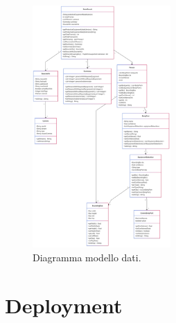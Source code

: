 \begin{figure}[htbp]
    \centering
    \includegraphics[width=0.47\textwidth]{figures/data-model.png}
    \caption{Diagramma modello dati.} 
    \label{fig:processing-subsystem}
\end{figure}


\section{Deployment}